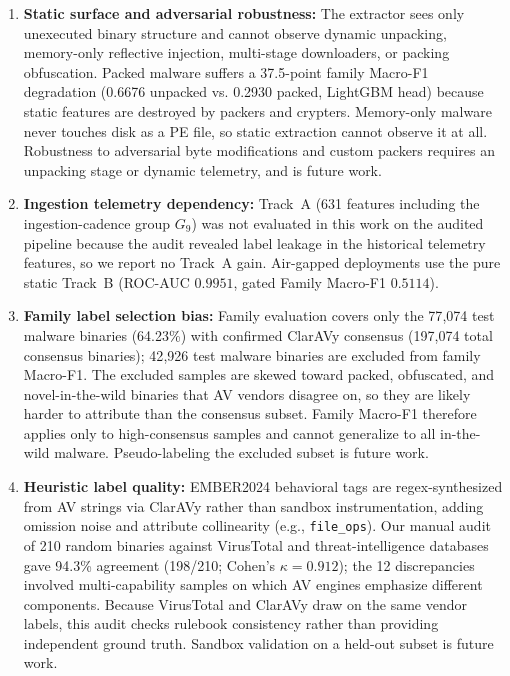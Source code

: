 \documentclass[Number]{sn-jnl}
\begin{document}
\begin{enumerate}[leftmargin=*]
\item \textbf{Static surface and adversarial robustness:} The extractor sees only unexecuted binary structure and cannot observe dynamic unpacking, memory-only reflective injection, multi-stage downloaders, or packing obfuscation. Packed malware suffers a 37.5-point family Macro-F1 degradation (0.6676 unpacked vs. 0.2930 packed, LightGBM head) because static features are destroyed by packers and crypters. Memory-only malware never touches disk as a PE file, so static extraction cannot observe it at all. Robustness to adversarial byte modifications and custom packers requires an unpacking stage or dynamic telemetry, and is future work.

\item \textbf{Ingestion telemetry dependency:} Track~A (631 features including the ingestion-cadence group $G_9$) was not evaluated in this work on the audited pipeline because the audit revealed label leakage in the historical telemetry features, so we report no Track~A gain. Air-gapped deployments use the pure static Track~B (ROC-AUC $0.9951$, gated Family Macro-F1 $0.5114$).

\item \textbf{Family label selection bias:} Family evaluation covers only the 77{,}074 test malware binaries (64.23\%) with confirmed ClarAVy consensus (197{,}074 total consensus binaries); 42{,}926 test malware binaries are excluded from family Macro-F1. The excluded samples are skewed toward packed, obfuscated, and novel-in-the-wild binaries that AV vendors disagree on, so they are likely harder to attribute than the consensus subset. Family Macro-F1 therefore applies only to high-consensus samples and cannot generalize to all in-the-wild malware. Pseudo-labeling the excluded subset is future work.

\item \textbf{Heuristic label quality:} EMBER2024 behavioral tags are regex-synthesized from AV strings via ClarAVy rather than sandbox instrumentation, adding omission noise and attribute collinearity (e.g., \texttt{file\_ops}). Our manual audit of 210 random binaries against VirusTotal and threat-intelligence databases gave 94.3\% agreement (198/210; Cohen's $\kappa=0.912$); the 12 discrepancies involved multi-capability samples on which AV engines emphasize different components. Because VirusTotal and ClarAVy draw on the same vendor labels, this audit checks rulebook consistency rather than providing independent ground truth. Sandbox validation on a held-out subset is future work.


\end{enumerate}
\end{document}
